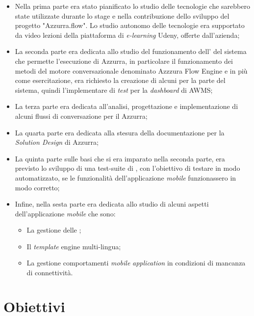 \begin{itemize}
	\item Nella prima parte era stato pianificato lo studio delle tecnologie che sarebbero state utilizzate durante lo stage e nella contribuzione dello sviluppo del progetto "Azzurra.flow". Lo studio autonomo delle tecnologie era supportato da video lezioni della piattaforma di \emph{e-learning} Udeny, offerte dall'azienda;
	\item La seconda parte era dedicata allo studio del funzionamento dell' del sistema che permette l'esecuzione di Azzurra, in particolare il funzionamento dei metodi del motore conversazionale denominato Azzzura Flow Engine e in più come esercitazione, era richiesto la creazione di alcuni  per la parte  del sistema, quindi l'implementare di \emph{test} per la \emph{dashboard} di \gls{AWMS};
	\item La terza parte era dedicata all'analisi, progettazione e implementazione di alcuni flussi di conversazione per il  Azzurra;
	\item La quarta parte era dedicata alla stesura della documentazione per la \emph{Solution Design} di Azzurra;
	\item La quinta parte sulle basi che si era imparato nella seconda parte, era previsto lo sviluppo di una test-suite di , con l'obiettivo di testare in modo automatizzato, se le funzionalità dell'applicazione \emph{mobile} funzionassero in modo corretto;
	\item Infine, nella sesta parte era dedicata allo studio di alcuni aspetti dell'applicazione \emph{mobile} che sono:
		\begin{itemize}
			\item La gestione delle \textcolor{SchoolColor}{\ap{[g]}};
			\item Il \emph{template} engine multi-lingua;
			\item La gestione comportamenti \emph{mobile} \emph{application} in condizioni di mancanza di connettività.
		\end{itemize}
\end{itemize}



\section{Obiettivi}

